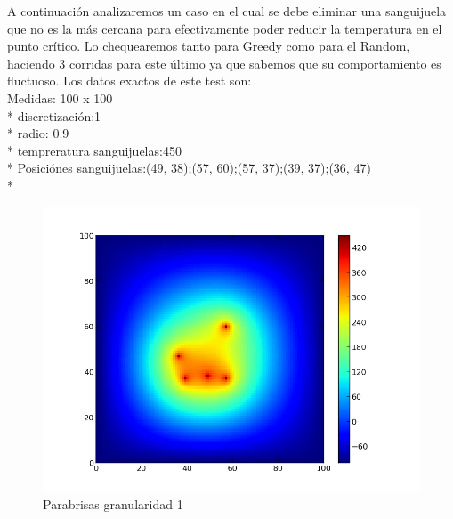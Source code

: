 A continuación analizaremos un caso en el cual se debe eliminar una sanguijuela que no es la más cercana para efectivamente poder reducir la temperatura en el punto crítico. Lo chequearemos tanto para Greedy como para el Random, haciendo 3 corridas para este último ya que sabemos que su comportamiento es fluctuoso.
Los datos exactos de este test son:\\
Medidas: 100 x 100 \\* 
discretización:1 \\* 
radio: 0.9 \\* 
tempreratura sanguijuelas:450 \\* 
Posiciónes sanguijuelas:(49, 38);(57, 60);(57, 37);(39, 37);(36, 47) \\* 
\begin{figure}[htb]
\begin{center}
\includegraphics[scale=0.40]{imagenes/test6.png} 
\caption{Parabrisas granularidad 1} 
\end{center}
\end{figure}

